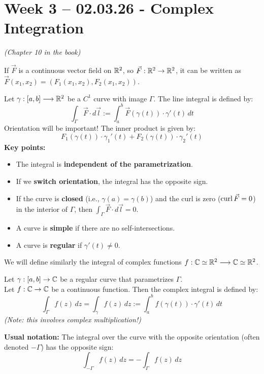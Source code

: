 \section{Week 3 -- 02.03.26 - Complex Integration}
\textit{(Chapter 10 in the book)}

\begin{recall}
If $\vec{F}$ is a continuous vector field on $\mathbb{R}^2$, so $\vec{F} : \mathbb{R}^2 \rightarrow \mathbb{R}^2$, it can be written as $\vec{F}(x_1, x_2) = (F_1(x_1, x_2), F_2(x_1, x_2))$. 

Let $\gamma : [a,b] \longrightarrow \mathbb{R}^2$ be a $C^1$ curve with image $\Gamma$. The line integral is defined by:
\[
\int_{\Gamma} \vec{F} \cdot d\vec{l} := \int_a^b \vec{F}(\gamma(t)) \cdot \gamma'(t) \, dt
\]
Orientation will be important! The inner product is given by:
\[
F_1(\gamma(t)) \cdot \gamma_1'(t) + F_2(\gamma(t)) \cdot \gamma_2'(t)
\]
\textbf{Key points:}
\begin{itemize}
    \item The integral is \textbf{independent of the parametrization}.
    \item If we \textbf{switch orientation}, the integral has the opposite sign.
    \item If the curve is \textbf{closed} (i.e., $\gamma(a) = \gamma(b)$) and the curl is zero ($\operatorname{curl} \vec{F} = 0$) in the interior of $\Gamma$, then $\int_{\Gamma} \vec{F} \cdot d\vec{l} = 0$.
    \item A curve is \textbf{simple} if there are no self-intersections.
    \item A curve is \textbf{regular} if $\gamma'(t) \neq 0$.
\end{itemize}
\end{recall}

We will define similarly the integral of complex functions $f : \mathbb{C} \simeq \mathbb{R}^2 \longrightarrow \mathbb{C} \simeq \mathbb{R}^2$.

\begin{definition}[Definition]
Let $\gamma : [a,b] \rightarrow \mathbb{C}$ be a regular curve that parametrizes $\Gamma$. \\
Let $f : \mathbb{C} \rightarrow \mathbb{C}$ be a continuous function. Then the complex integral is defined by:
\[
\int_{\Gamma} f(z) \, dz = \int_{\gamma} f(z) \, dz := \int_a^b f(\gamma(t)) \cdot \gamma'(t) \, dt
\]
\textit{(Note: this involves complex multiplication!)}

\vspace{0.2cm}
\textbf{Usual notation:} The integral over the curve with the opposite orientation (often denoted $-\Gamma$) has the opposite sign:
\[
\int_{-\Gamma} f(z) \, dz = - \int_{\Gamma} f(z) \, dz
\]
\end{definition}

